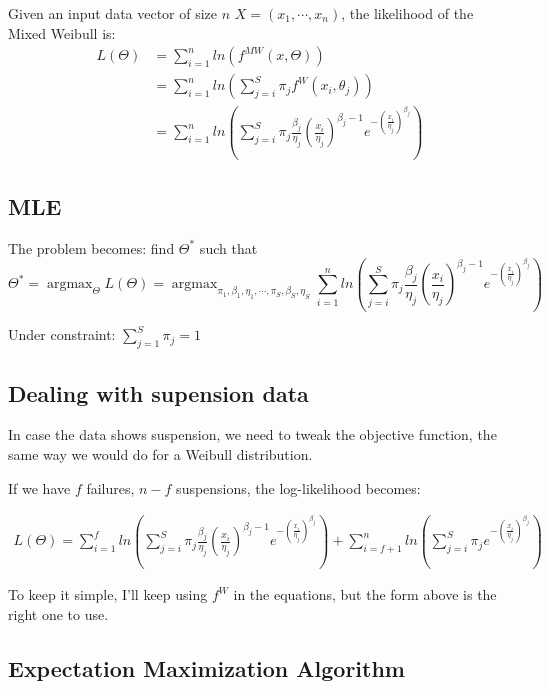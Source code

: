 \documentclass[a4paper,11pt]{article}
\DeclareMathOperator*{\argmax}{argmax}
\begin{document}
Given an input data vector of size $n$ $X = (x_1, \cdots, x_n)$, the likelihood of the Mixed Weibull is:
\begin{align*}
L(\Theta) & = \sum_{i=1}^{n} ln(f^{MW} (x,\Theta)) \\ \
		  & = \sum_{i=1}^{n} ln\left(\sum_{j=i}^{S} \pi_j f^W (x_i,\theta_j)\right) \\ \
		  & = \sum_{i=1}^{n} ln\left(\sum_{j=i}^{S} \pi_j\frac{\beta_j}{\eta_j} \left( \frac{x_i}{\eta_j} \right)^{\beta_j-1} e^{-(\frac{x_i}{\eta_j})^{\beta_j}} \right)
\end{align*}

\subsection{MLE}

The problem becomes: find $\Theta^*$ such that
$$ \Theta^* = \argmax_{\Theta} L(\Theta) = \argmax_{\pi_1,\beta_1,\eta_1,\cdots,\pi_S,\beta_S,\eta_S} \sum_{i=1}^{n} ln\left(\sum_{j=i}^{S} \pi_j\frac{\beta_j}{\eta_j} \left( \frac{x_i}{\eta_j} \right)^{\beta_j-1} e^{-(\frac{x_i}{\eta_j})^{\beta_j}} \right)$$

Under constraint: $\sum_{j=1}^{S} \pi_j = 1$


\subsection{Dealing with supension data}

In case the data shows suspension, we need to tweak the objective function, the same way we would do for a Weibull distribution. 


If we have $f$ failures, $n-f$ suspensions, the log-likelihood becomes:

\begin{align*}
L(\Theta) = \sum_{i=1}^{f} ln\left(\sum_{j=i}^{S} \pi_j\frac{\beta_j}{\eta_j} \left( \frac{x_i}{\eta_j} \right)^{\beta_j-1} e^{-(\frac{x_i}{\eta_j})^{\beta_j}} \right) +
\sum_{i=f+1}^{n} ln\left(\sum_{j=i}^{S} \pi_j e^{-(\frac{x_i}{\eta_j})^{\beta_j}} \right)
\end{align*}


To keep it simple, I'll keep using $f^W$ in the equations, but the form above is the right one to use.

\subsection{Expectation Maximization Algorithm}
\end{document}
